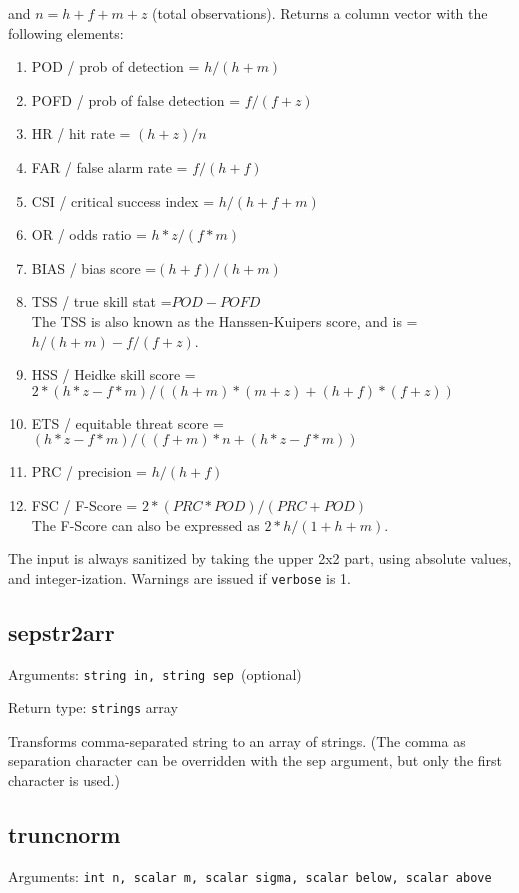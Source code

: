 \documentclass[11pt,english]{article}
\begin{document}
and $n=h+f+m+z$ (total observations). Returns a column vector with
the following elements:
\begin{enumerate}
\item POD / prob of detection = $h/(h+m)$
\item POFD / prob of false detection = $f/(f+z)$ 
\item HR / hit rate = $(h+z)/n$ 
\item FAR / false alarm rate = $f/(h+f)$ 
\item CSI / critical success index = $h/(h+f+m)$
\item OR / odds ratio = $h*z/(f*m)$
\item BIAS / bias score =$(h+f)/(h+m)$
\item TSS / true skill stat =$POD-POFD$\\
The TSS is also known as the Hanssen-Kuipers score, and is = $h/(h+m)-f/(f+z)$.
\item HSS / Heidke skill score = $2*(h*z-f*m)/((h+m)*(m+z)+(h+f)*(f+z))$
\item ETS / equitable threat score = $(h*z-f*m)/((f+m)*n+(h*z-f*m))$
\item PRC / precision = $h/(h+f)$
\item FSC / F-Score = $2*(PRC*POD)/(PRC+POD)$\\
The F-Score can also be expressed as $2*h/(1+h+m)$.
\end{enumerate}
The input is always sanitized by taking the upper 2x2 part, using
absolute values, and integer-ization. Warnings are issued if \texttt{verbose}
is 1. 

\subsection{sepstr2arr}

Arguments: \texttt{string in, string sep }(optional)

\noindent Return type: \texttt{strings} array

Transforms comma-separated string to an array of strings. (The comma
as separation character can be overridden with the sep argument, but
only the first character is used.) 

\subsection{truncnorm }

Arguments: \texttt{int n, scalar m, scalar sigma, scalar below, scalar
above}
\end{document}
